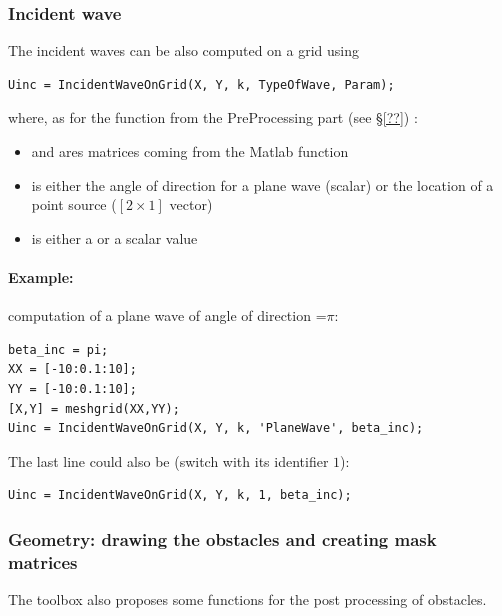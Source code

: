 \subsubsection{Incident wave}

The incident waves can be also computed on a grid using 
\begin{lstlisting}
Uinc = IncidentWaveOnGrid(X, Y, k, TypeOfWave, Param);
\end{lstlisting}
where, as for the  function from the PreProcessing part (see \S\ref{??}) :
\begin{itemize}
\item {} and  ares matrices coming from the  Matlab function
\item {} is either the angle of direction for a plane wave (scalar) or the location of a point source ($[2\times1]$ vector)
\item {} is either a  or a scalar value 
\end{itemize}
\paragraph{Example:} computation of a plane wave of angle of direction =$\pi$:
\begin{lstlisting}
beta_inc = pi;
XX = [-10:0.1:10];
YY = [-10:0.1:10];
[X,Y] = meshgrid(XX,YY);
Uinc = IncidentWaveOnGrid(X, Y, k, 'PlaneWave', beta_inc);
\end{lstlisting}
The last line could also be (switch  with its identifier $1$):
\begin{lstlisting}
Uinc = IncidentWaveOnGrid(X, Y, k, 1, beta_inc);
\end{lstlisting}

 
\subsubsection{Geometry: drawing the obstacles and creating mask matrices}

The \mudiff toolbox also proposes some functions for the post processing of obstacles. 
